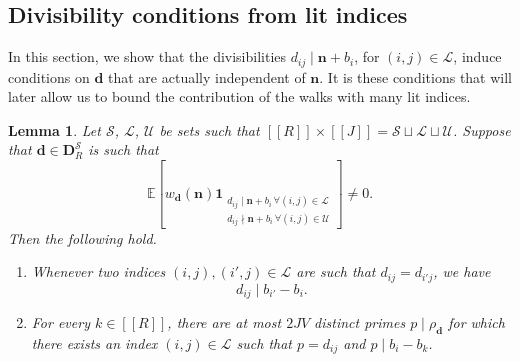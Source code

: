 \documentclass[11pt]{amsart}
\newtheorem{lemma}[theorem]{Lemma}
\theoremstyle{definition}
\newcommand{\sinterval}[1]{[\![#1]\!] }
\newcommand{\ind}[1]{\mathbf{1}_{#1}}
\newcommand{\E}{\mathbb{E}}
\renewcommand{\d}{\boldsymbol{d}}
\newcommand{\pcomp}[2]{d_{#1#2}}
\newcommand{\n}{\mathbf{n}}
\newcommand{\curlyL}{V}
\newcommand{\sommespart}{b}
\newcommand{\fprod}[1]{\rho_{#1}}
\newcommand{\pall}{\fprod{\d}}
\newcommand{\lit}{\mathcal{L}}
\newcommand{\unlit}{\mathcal{U}}
\newcommand{\s}{\mathcal{S}}
\newcommand{\fancyD}{\mathbf{D}}
\newcommand{\DsR}{\fancyD^{\s}_{\!\tupsize}}
\newcommand{\repR}{J}
\newcommand{\newR}{\sinterval{J}}
\newcommand{\newerKRR}{\sinterval{\tupsize}\times\newR}
\newcommand{\tupsize}{R}
\begin{document}
\subsection{Divisibility conditions from lit indices}

In this section, we show that the divisibilities ${\pcomp{i}{j}\mid \n+\sommespart_i}$, for $(i,j)\in \lit$, induce conditions on $\d$ that are actually independent of $\n$. It is these conditions that will later allow us to bound the contribution of the walks with many lit indices.

\begin{lemma}
\label{lem:litcond}
Let $\s$, $\lit$, $\unlit$ be sets such that $\newerKRR = \s\sqcup\lit\sqcup\unlit$. Suppose that $\d\in \DsR$ is such that
\begin{equation}
\label{eq:expectnonzero}
	\E \left[w_{\d}(\n) \ind{\substack{\pcomp{i}{j}\mid \n+\sommespart_i \, \forall (i,j)\in \lit \\ \pcomp{i}{j}\nmid \n+\sommespart_i \, \forall (i,j)\in \unlit}} \right] \neq 0.
\end{equation}
Then the following hold.
\begin{enumerate}
	\item \label{item:litcond1} Whenever two indices $(i,j), (i',j)\in \lit$ are such that $\pcomp{i}{j} = \pcomp{i'}{j}$, we have
	\begin{equation*}
		\pcomp{i}{j} \mid \sommespart_{i'} - \sommespart_{i}.
	\end{equation*}
	\item \label{item:litcond2} For every $k\in \sinterval{\tupsize}$, there are at most $2\repR\curlyL$ distinct primes $p\mid \pall$ for which there exists an index $(i,j)\in \lit$ such that $p = \pcomp{i}{j}$ and $p\mid \sommespart_{i} - \sommespart_{k}$.
\end{enumerate}
\end{lemma}
\end{document}
